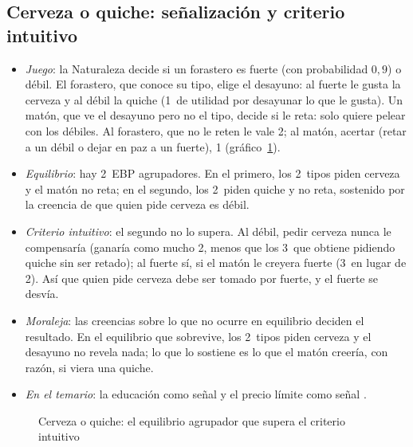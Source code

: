 \documentclass[11pt]{article}
\begin{document}
\subsection*{Cerveza o quiche: señalización y criterio intuitivo}

\begin{itemize}
\item \emph{Juego}\nocite{ChoKreps1987Signaling}: la Naturaleza decide si un forastero es fuerte (con probabilidad $0{,}9$) o débil. El forastero, que conoce su tipo, elige el desayuno: al fuerte le gusta la cerveza y al débil la quiche (1~de utilidad por desayunar lo que le gusta). Un matón, que ve el desayuno pero no el tipo, decide si le reta: solo quiere pelear con los débiles. Al forastero, que no le reten le vale 2; al matón, acertar (retar a un débil o dejar en paz a un fuerte), 1 (gráfico~\ref{fig:cerveza-quiche}).
\item \emph{Equilibrio}: hay 2~EBP agrupadores. En el primero, los 2~tipos piden cerveza y el matón no reta; en el segundo, los 2~piden quiche y no reta, sostenido por la creencia de que quien pide cerveza es débil.
\item \emph{Criterio intuitivo}: el segundo no lo supera. Al débil, pedir cerveza nunca le compensaría (ganaría como mucho 2, menos que los 3~que obtiene pidiendo quiche sin ser retado); al fuerte sí, si el matón le creyera fuerte (3~en lugar de 2). Así que quien pide cerveza debe ser tomado por fuerte, y el fuerte se desvía.
\item \emph{Moraleja}: las creencias sobre lo que no ocurre en equilibrio deciden el resultado. En el equilibrio que sobrevive, los 2~tipos piden cerveza y el desayuno no revela nada; lo que lo sostiene es lo que el matón creería, con razón, si viera una quiche.
\item \emph{En el temario}: la educación como señal  y el precio límite como señal .
\end{itemize}

\begin{figure}[H]
\centering
\caption{Cerveza o quiche: el equilibrio agrupador que supera el criterio intuitivo}\label{fig:cerveza-quiche}
\end{figure}
\end{document}
